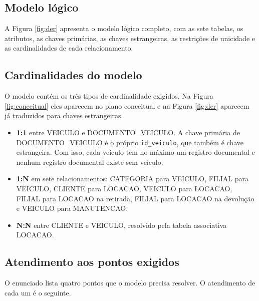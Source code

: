 \subsection{Modelo l\'ogico}

A Figura \ref{fig:der} apresenta o modelo l\'ogico completo, com as sete tabelas, os atributos, as chaves prim\'arias, as chaves estrangeiras, as restri\c{c}\~oes de unicidade e as cardinalidades de cada relacionamento.

\subsection{Cardinalidades do modelo}

O modelo cont\'em os tr\^es tipos de cardinalidade exigidos. Na Figura \ref{fig:conceitual} eles aparecem no plano conceitual e na Figura \ref{fig:der} aparecem j\'a traduzidos para chaves estrangeiras.

\begin{itemize}
\item \textbf{1:1} entre VEICULO e DOCUMENTO\_VEICULO. A chave prim\'aria de DOCUMENTO\_VEICULO \'e o pr\'oprio \texttt{id\_veiculo}, que tamb\'em \'e chave estrangeira. Com isso, cada ve\'iculo tem no m\'aximo um registro documental e nenhum registro documental existe sem ve\'iculo.
\item \textbf{1:N} em sete relacionamentos: CATEGORIA para VEICULO, FILIAL para VEICULO, CLIENTE para LOCACAO, VEICULO para LOCACAO, FILIAL para LOCACAO na retirada, FILIAL para LOCACAO na devolu\c{c}\~ao e VEICULO para MANUTENCAO.
\item \textbf{N:N} entre CLIENTE e VEICULO, resolvido pela tabela associativa LOCACAO.
\end{itemize}

\subsection{Atendimento aos pontos exigidos}

O enunciado lista quatro pontos que o modelo precisa resolver. O atendimento de cada um \'e o seguinte.

